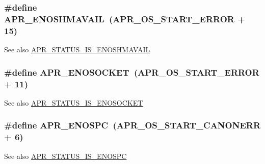 \subsubsection[{\texorpdfstring{A\+P\+R\+\_\+\+E\+N\+O\+S\+H\+M\+A\+V\+A\+IL}{APR_ENOSHMAVAIL}}]{\setlength{\rightskip}{0pt plus 5cm}\#define A\+P\+R\+\_\+\+E\+N\+O\+S\+H\+M\+A\+V\+A\+IL~({\bf A\+P\+R\+\_\+\+O\+S\+\_\+\+S\+T\+A\+R\+T\+\_\+\+E\+R\+R\+OR} + 15)}\hypertarget{group___a_p_r___error_ga67516f4e87197490333480a8bbc78725}{}\label{group___a_p_r___error_ga67516f4e87197490333480a8bbc78725}
\begin{DoxySeeAlso}{See also}
\hyperlink{group___a_p_r___s_t_a_t_u_s___i_s_gaaf744d95d46d09dcfd9e6314ab9b5d97}{A\+P\+R\+\_\+\+S\+T\+A\+T\+U\+S\+\_\+\+I\+S\+\_\+\+E\+N\+O\+S\+H\+M\+A\+V\+A\+IL} 
\end{DoxySeeAlso}
\subsubsection[{\texorpdfstring{A\+P\+R\+\_\+\+E\+N\+O\+S\+O\+C\+K\+ET}{APR_ENOSOCKET}}]{\setlength{\rightskip}{0pt plus 5cm}\#define A\+P\+R\+\_\+\+E\+N\+O\+S\+O\+C\+K\+ET~({\bf A\+P\+R\+\_\+\+O\+S\+\_\+\+S\+T\+A\+R\+T\+\_\+\+E\+R\+R\+OR} + 11)}\hypertarget{group___a_p_r___error_ga99e125e203a1d44f12bd88b41696716d}{}\label{group___a_p_r___error_ga99e125e203a1d44f12bd88b41696716d}
\begin{DoxySeeAlso}{See also}
\hyperlink{group___a_p_r___s_t_a_t_u_s___i_s_ga30609f2f19e2e90ba4e26991464adde7}{A\+P\+R\+\_\+\+S\+T\+A\+T\+U\+S\+\_\+\+I\+S\+\_\+\+E\+N\+O\+S\+O\+C\+K\+ET} 
\end{DoxySeeAlso}
\subsubsection[{\texorpdfstring{A\+P\+R\+\_\+\+E\+N\+O\+S\+PC}{APR_ENOSPC}}]{\setlength{\rightskip}{0pt plus 5cm}\#define A\+P\+R\+\_\+\+E\+N\+O\+S\+PC~({\bf A\+P\+R\+\_\+\+O\+S\+\_\+\+S\+T\+A\+R\+T\+\_\+\+C\+A\+N\+O\+N\+E\+RR} + 6)}\hypertarget{group___a_p_r___error_ga1dfc0bbf080f17b0b9010ef967542193}{}\label{group___a_p_r___error_ga1dfc0bbf080f17b0b9010ef967542193}
\begin{DoxySeeAlso}{See also}
\hyperlink{group___a_p_r___s_t_a_t_u_s___i_s_ga110ed2db065c311efcc689176fb4af06}{A\+P\+R\+\_\+\+S\+T\+A\+T\+U\+S\+\_\+\+I\+S\+\_\+\+E\+N\+O\+S\+PC} 
\end{DoxySeeAlso}
